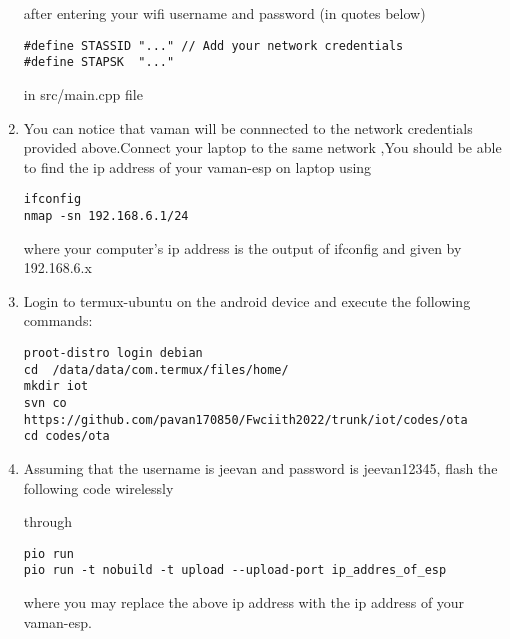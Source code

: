 \documentclass[10pt, a4paper]{article}
\begin{document}
\begin{enumerate}
after entering your wifi username and password (in quotes below)
\begin{lstlisting}
#define STASSID "..." // Add your network credentials
#define STAPSK  "..."
\end{lstlisting}
in src/main.cpp file
\item You can notice that vaman will be connnected to the network credentials provided above.Connect your laptop to the same network ,You should be able to find the ip address of your vaman-esp on laptop using 
\begin{lstlisting}
ifconfig
nmap -sn 192.168.6.1/24
\end{lstlisting}
where your computer's ip address is the output of ifconfig and given by 192.168.6.x
\item Login to termux-ubuntu on the android device and execute the following commands:
\begin{lstlisting}
proot-distro login debian
cd  /data/data/com.termux/files/home/
mkdir iot
svn co https://github.com/pavan170850/Fwciith2022/trunk/iot/codes/ota
cd codes/ota
\end{lstlisting}
\item Assuming that the username is jeevan and password is jeevan12345, flash the following code wirelessly
\begin{center}
\end{center}
through 
\begin{lstlisting}
pio run 
pio run -t nobuild -t upload --upload-port ip_addres_of_esp
\end{lstlisting}
where you may replace the above ip address with the ip address of your vaman-esp.
\end{enumerate}
\end{document}
